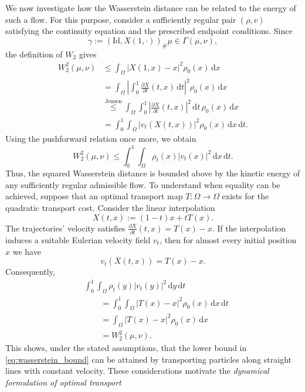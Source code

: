 We now investigate how the Wasserstein distance can be related to the energy of such a flow. For this purpose, consider a sufficiently regular pair $(\rho,v)$ satisfying the continuity equation and the prescribed endpoint conditions. Since 
$$
\gamma := (\mathrm{Id},X(1,\cdot))_\#\mu\in\Gamma(\mu,\nu),
$$
the definition of $W_2$ gives
\begin{align*}
	W_2^2(\mu,\nu)&\leq \int_\Omega|X(1,x)-x|^2\rho_0(x)\,\mathrm{d}x\\
				  &= \int_\Omega\left|\int_0^1\frac{\partial X}{\partial t}(t,x)\,\mathrm{d}t\right|^2\rho_0(x)\,\mathrm{d}x\\
				  &\overset{\text{Jensen}}{\leq} \int_\Omega\int_0^1\left|\frac{\partial X}{\partial t}(t,x)\right|^2\,\mathrm{d}t\,\rho_0(x)\,\mathrm{d}x\\
				  &=\int_0^1\int_\Omega|v_t(X(t,x))|^2\rho_0(x)\,\mathrm{d}x\,\mathrm{d}t.
\end{align*}
Using the pushforward relation once more, we obtain 
\begin{equation*}
	W_2^2(\mu,\nu)\leq \int_0^1\int_\Omega\rho_t(x)|v_t(x)|^2\,\mathrm{d}x\,\mathrm{d}t.\label{eq:wasserstein_bound}
\end{equation*}
Thus, the squared Wasserstein distance is bounded above by the kinetic energy of any sufficiently regular admissible flow. To understand when equality can be achieved, suppose that an optimal transport map $T:\Omega\to\Omega$ exists for the quadratic transport cost. Consider the linear interpolation
\begin{equation*}
	X(t,x):=(1-t)x + tT(x).\label{eq:interpolation}
\end{equation*}
The trajectories' velocity satisfies $\frac{\partial X}{\partial t}(t,x) = T(x) - x$. If the interpolation induces a suitable Eulerian velocity field $v_t$, then for almost every initial position $x$ we have
$$
v_t(X(t,x)) = T(x) -x.
$$
Consequently,
\begin{align*}
	&\int_0^1\int_\Omega\rho_t(y)|v_t(y)|^2\,\mathrm{d}y\,\mathrm{d}t\\
	&\qquad=\int_0^1\int_\Omega |T(x)-x|^2\rho_0(x)\,\mathrm{d}x\,\mathrm{d}t\\
	&\qquad=\int_\Omega |T(x)-x|^2\rho_0(x)\,\mathrm{d}x\\
	&\qquad=W_2^2(\mu,\nu).
\end{align*}
This shows, under the stated assumptions, that the lower bound in \eqref{eq:wasserstein_bound} can be attained by transporting particles along straight lines with constant velocity. These considerations motivate the \emph{dynamical formulation of optimal transport}
